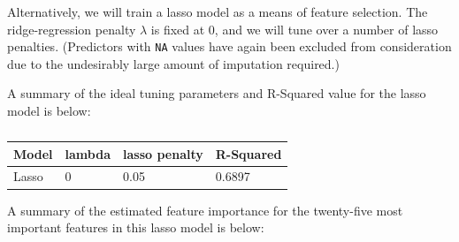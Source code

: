 \documentclass[
  man,floatsintext]{apa6}
\begin{document}
Alternatively, we will train a lasso model as a means of feature selection. The ridge-regression penalty \(\lambda\) is fixed at 0, and we will tune over a number of lasso penalties. (Predictors with \texttt{NA} values have again been excluded from consideration due to the undesirably large amount of imputation required.)

A summary of the ideal tuning parameters and R-Squared value for the lasso model is below:

\begin{table}[H]

\begin{center}
\begin{threeparttable}

\caption{\label{tab:unnamed-chunk-10}}

\begin{tabular}{llll}
\toprule
Model & \multicolumn{1}{c}{lambda} & \multicolumn{1}{c}{lasso penalty} & \multicolumn{1}{c}{R-Squared}\\
\midrule
Lasso & 0 & 0.05 & 0.6897\\
\bottomrule
\end{tabular}

\end{threeparttable}
\end{center}

\end{table}

A summary of the estimated feature importance for the twenty-five most important features in this lasso model is below:
\end{document}
